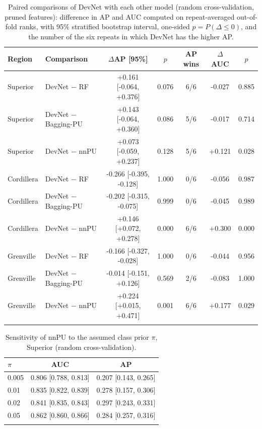 \documentclass[pdflatex,sn-apa]{sn-jnl}
\begin{document}
\begin{table}[t]
\caption{Paired comparisons of DevNet with each other model (random cross-validation, pruned features): difference in AP and AUC computed on repeat-averaged out-of-fold ranks, with 95\% stratified bootstrap interval, one-sided $p = P(\Delta \leq 0)$, and the number of the six repeats in which DevNet has the higher AP.}\label{tab:bootstrap}
\footnotesize
\setlength{\tabcolsep}{2.5pt}
\begin{tabular*}{\textwidth}{@{\extracolsep\fill}llccccc}
\toprule
Region & Comparison & $\Delta$AP [95\%] & $p$ & AP wins & $\Delta$AUC & $p$ \\
\midrule
Superior & DevNet $-$ RF & +0.161 [-0.064, +0.376] & 0.076 & 6/6 & -0.027 & 0.885 \\
Superior & DevNet $-$ Bagging-PU & +0.143 [-0.064, +0.360] & 0.086 & 5/6 & -0.017 & 0.714 \\
Superior & DevNet $-$ nnPU & +0.073 [-0.059, +0.237] & 0.128 & 5/6 & +0.121 & 0.028 \\
\addlinespace
Cordillera & DevNet $-$ RF & -0.266 [-0.395, -0.128] & 1.000 & 0/6 & -0.056 & 0.987 \\
Cordillera & DevNet $-$ Bagging-PU & -0.202 [-0.315, -0.075] & 0.999 & 0/6 & -0.045 & 0.989 \\
Cordillera & DevNet $-$ nnPU & +0.146 [+0.072, +0.278] & 0.000 & 6/6 & +0.300 & 0.000 \\
\addlinespace
Grenville & DevNet $-$ RF & -0.166 [-0.327, -0.028] & 1.000 & 0/6 & -0.044 & 0.956 \\
Grenville & DevNet $-$ Bagging-PU & -0.014 [-0.151, +0.126] & 0.569 & 2/6 & -0.083 & 1.000 \\
Grenville & DevNet $-$ nnPU & +0.224 [+0.015, +0.471] & 0.001 & 6/6 & +0.177 & 0.029 \\
\botrule
\end{tabular*}
\end{table}

\begin{table}[t]
\caption{Sensitivity of nnPU to the assumed class prior $\pi$, Superior (random cross-validation).}\label{tab:prior}
\footnotesize
\begin{tabular*}{0.6\textwidth}{@{\extracolsep\fill}lcc}
\toprule
$\pi$ & AUC & AP \\
\midrule
0.005 & 0.806 [0.788, 0.813] & 0.207 [0.143, 0.265] \\
0.01 & 0.835 [0.822, 0.839] & 0.278 [0.157, 0.306] \\
0.02 & 0.841 [0.835, 0.843] & 0.297 [0.243, 0.331] \\
0.05 & 0.862 [0.860, 0.866] & 0.284 [0.257, 0.316] \\
\botrule
\end{tabular*}
\end{table}
\end{document}
